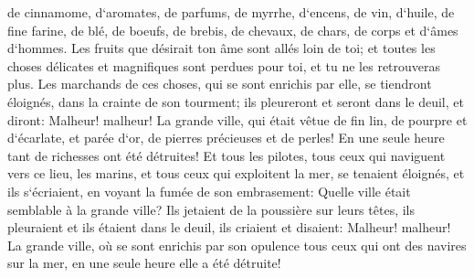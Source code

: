 \verse de cinnamome, d`aromates, de parfums, de myrrhe, d`encens, de vin, d`huile, de fine farine, de blé, de boeufs, de brebis, de chevaux, de chars, de corps et d`âmes d`hommes. 
\verse Les fruits que désirait ton âme sont allés loin de toi; et toutes les choses délicates et magnifiques sont perdues pour toi, et tu ne les retrouveras plus. 
\verse Les marchands de ces choses, qui se sont enrichis par elle, se tiendront éloignés, dans la crainte de son tourment; ils pleureront et seront dans le deuil, 
\verse et diront: Malheur! malheur! La grande ville, qui était vêtue de fin lin, de pourpre et d`écarlate, et parée d`or, de pierres précieuses et de perles! En une seule heure tant de richesses ont été détruites! 
\verse Et tous les pilotes, tous ceux qui naviguent vers ce lieu, les marins, et tous ceux qui exploitent la mer, se tenaient éloignés, 
\verse et ils s`écriaient, en voyant la fumée de son embrasement: Quelle ville était semblable à la grande ville? 
\verse Ils jetaient de la poussière sur leurs têtes, ils pleuraient et ils étaient dans le deuil, ils criaient et disaient: Malheur! malheur! La grande ville, où se sont enrichis par son opulence tous ceux qui ont des navires sur la mer, en une seule heure elle a été détruite! 
